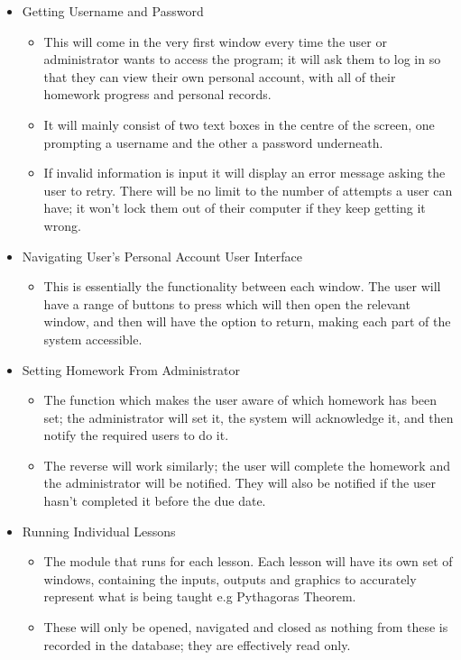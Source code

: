 \begin{itemize}
	\item Getting Username and Password
	\begin{itemize}
		\item This will come in the very first window every time the user or administrator wants to access the program; it will ask them to log in so that they can view their own personal account, with all of their homework progress and personal records.
		\item It will mainly consist of two text boxes in the centre of the screen, one prompting a username and the other a password underneath. 
		\item If invalid information is input it will display an error message asking the user to retry. There will be no limit to the number of attempts a user can have; it won't lock them out of their computer if they keep getting it wrong.
	\end{itemize}
\end{itemize}

\begin{itemize}
	\item Navigating User's Personal Account User Interface
	\begin{itemize}
		\item This is essentially the functionality between each window. The user will have a range of buttons to press which will then open the relevant window, and then will have the option to return, making each part of the system accessible.
	\end{itemize}
\end{itemize}

\begin{itemize}
	\item Setting Homework From Administrator
	\begin{itemize}
		\item The function which makes the user aware of which homework has been set; the administrator will set it, the system will acknowledge it, and then notify the required users to do it.
		\item The reverse will work similarly; the user will complete the homework and the administrator will be notified. They will also be notified if the user hasn't completed it before the due date.
	\end{itemize}
\end{itemize}

\begin{itemize}
	\item Running Individual Lessons
	\begin{itemize}
		\item The module that runs for each lesson. Each lesson will have its own set of windows, containing the inputs, outputs and graphics to accurately represent what is being taught e.g Pythagoras Theorem.
		\item These will only be opened, navigated and closed as nothing from these is recorded in the database; they are effectively read only.
	\end{itemize}
\end{itemize}

